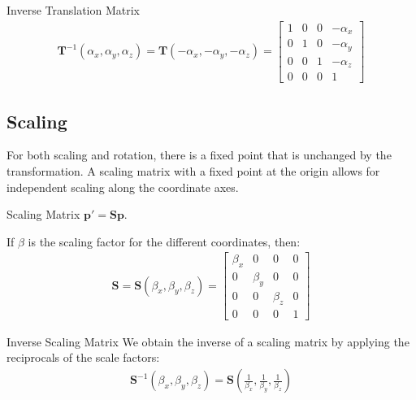 \documentclass[../COS3712_Notes.tex]{subfiles}
\begin{document}
        \begin{theorem}{Inverse Translation Matrix}
          \begin{align*}
            \mathbf{T}^{-1}(\alpha_x, \alpha_y, \alpha_z) = \mathbf{T}(-\alpha_x, -\alpha_y, -\alpha_z)
              = \begin{bmatrix}
                1 & 0 & 0 & -\alpha_x \\
                0 & 1 & 0 & -\alpha_y \\
                0 & 0 & 1 & -\alpha_z \\
                0 & 0 & 0 & 1
              \end{bmatrix}
          \end{align*}
        \end{theorem}

      \subsection{Scaling}
        For both scaling and rotation, there is a fixed point that is unchanged by the
        transformation.
        A scaling matrix with a fixed point at the origin allows for independent scaling
        along the coordinate axes.

        \begin{theorem}{Scaling Matrix}
          $\mathbf{p}' = \mathbf{Sp}$.

          If $\beta$ is the scaling factor for the different coordinates, then:
          \begin{align*}
            \mathbf{S} = \mathbf{S}(\beta_x, \beta_y, \beta_z)
            = \begin{bmatrix}
              \beta_x & 0 & 0 & 0 \\
              0 & \beta_y & 0 & 0 \\
              0 & 0 & \beta_z & 0 \\
              0 & 0 & 0 & 1
            \end{bmatrix}
          \end{align*}
        \end{theorem}

        \begin{theorem}{Inverse Scaling Matrix}
          We obtain the inverse of a scaling matrix by applying the reciprocals of the scale factors:
          \begin{align*}
            \mathbf{S}^{-1}(\beta_x, \beta_y, \beta_z)
            = \mathbf{S}\left(\frac{1}{\beta_x}, \frac{1}{\beta_y}, \frac{1}{\beta_z}\right)
          \end{align*}
        \end{theorem}
\end{document}
